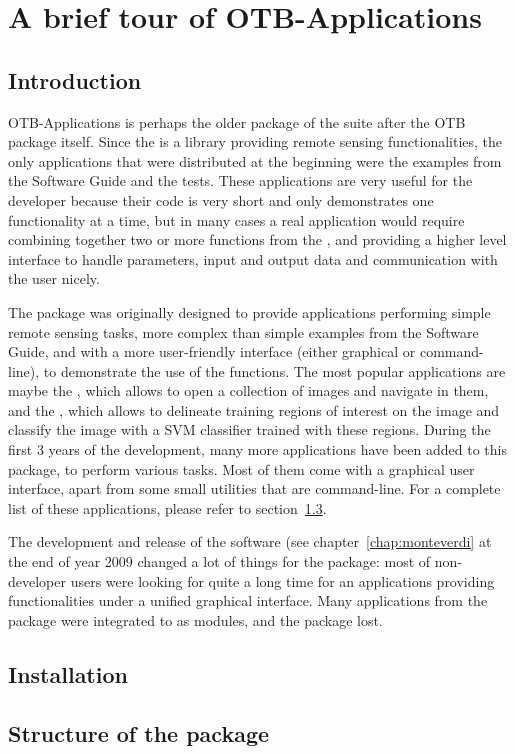 \chapter{A brief tour of OTB-Applications}\label{chap:otb-applications}

\section{Introduction}\label{sec:appintro}

OTB-Applications is perhaps the older package of the \otb
suite after the OTB package itself. Since the \otb is a
library providing remote sensing functionalities, the only
applications that were distributed at the beginning were the examples
from the Software Guide and the tests. These applications are very
useful for the developer because their code is very short and only
demonstrates one functionality at a time, but in many cases a real
application would require combining together two or more functions
from the \otb, and providing a higher level interface to
handle parameters, input and output data and communication with the
user nicely.

The \app package was originally designed to provide applications
performing simple remote sensing tasks, more complex than simple
examples from the Software Guide, and with a more user-friendly
interface (either graphical or command-line), to demonstrate the use
of the \otb functions. The most popular applications are maybe the
, which allows to open a collection
of images and navigate in them, and the
, which allows to
delineate training regions of interest on the image and classify the
image with a SVM classifier trained with these regions. During the
first 3 years of the \otb development, many more applications have
been added to this package, to perform various tasks. Most of them
come with a graphical user interface, apart from some small utilities
that are command-line.  For a complete list of these applications,
please refer to section~\ref{sec:appstruct}.

The development and release of the \mont software (see
chapter~\ref{chap:monteverdi} at the end of year 2009 changed a lot of
things for the \app package: most of non-developer users were looking
for quite a long time for an applications providing \otb
functionalities under a unified graphical interface. Many applications
from the \app package were integrated to \mont as modules, and the
\app package lost.


\section{Installation}\label{sec:appinstall}


\section{Structure of the package}\label{sec:appstruct}
